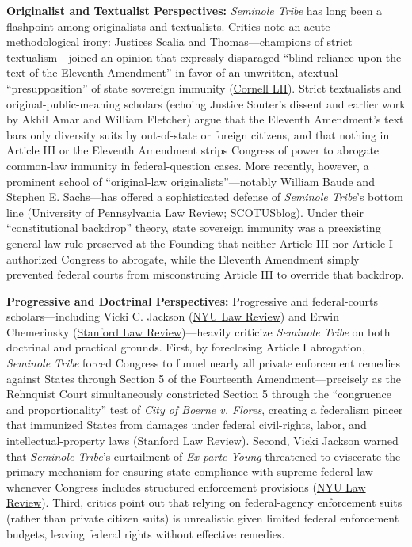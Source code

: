 \documentclass[12pt]{article}
\begin{document}
\textbf{Originalist and Textualist Perspectives:} \textit{Seminole Tribe} has long been a flashpoint among originalists and textualists. Critics note an acute methodological irony: Justices Scalia and Thomas---champions of strict textualism---joined an opinion that expressly disparaged ``blind reliance upon the text of the Eleventh Amendment'' in favor of an unwritten, atextual ``presupposition'' of state sovereign immunity (\href{https://www.law.cornell.edu/supct/html/94-12.ZO.html}{Cornell LII}). Strict textualists and original-public-meaning scholars (echoing Justice Souter's dissent and earlier work by Akhil Amar and William Fletcher) argue that the Eleventh Amendment's text bars only diversity suits by out-of-state or foreign citizens, and that nothing in Article III or the Eleventh Amendment strips Congress of power to abrogate common-law immunity in federal-question cases. More recently, however, a prominent school of ``original-law originalists''---notably William Baude and Stephen E. Sachs---has offered a sophisticated defense of \textit{Seminole Tribe}'s bottom line (\href{https://pennlawreview.com/2021/05/11/the-misunderstood-eleventh-amendment/}{University of Pennsylvania Law Review}; \href{https://www.scotusblog.com/2016/01/academic-highlight-baude-and-sachs-on-state-sovereign-immunity/}{SCOTUSblog}). Under their ``constitutional backdrop'' theory, state sovereign immunity was a preexisting general-law rule preserved at the Founding that neither Article III nor Article I authorized Congress to abrogate, while the Eleventh Amendment simply prevented federal courts from misconstruing Article III to override that backdrop.

\textbf{Progressive and Doctrinal Perspectives:} Progressive and federal-courts scholars---including Vicki C. Jackson (\href{https://www.nyulawreview.org/wp-content/uploads/2018/08/NYULawReview-72-3-Jackson.pdf}{NYU Law Review}) and Erwin Chemerinsky (\href{http://www.stanfordlawreview.org/wp-content/uploads/sites/3/2010/04/chemerinsky.pdf}{Stanford Law Review})---heavily criticize \textit{Seminole Tribe} on both doctrinal and practical grounds. First, by foreclosing Article I abrogation, \textit{Seminole Tribe} forced Congress to funnel nearly all private enforcement remedies against States through Section 5 of the Fourteenth Amendment---precisely as the Rehnquist Court simultaneously constricted Section 5 through the ``congruence and proportionality'' test of \textit{City of Boerne v. Flores}, creating a federalism pincer that immunized States from damages under federal civil-rights, labor, and intellectual-property laws (\href{http://www.stanfordlawreview.org/wp-content/uploads/sites/3/2010/04/chemerinsky.pdf}{Stanford Law Review}). Second, Vicki Jackson warned that \textit{Seminole Tribe}'s curtailment of \textit{Ex parte Young} threatened to eviscerate the primary mechanism for ensuring state compliance with supreme federal law whenever Congress includes structured enforcement provisions (\href{https://www.nyulawreview.org/wp-content/uploads/2018/08/NYULawReview-72-3-Jackson.pdf}{NYU Law Review}). Third, critics point out that relying on federal-agency enforcement suits (rather than private citizen suits) is unrealistic given limited federal enforcement budgets, leaving federal rights without effective remedies.
\end{document}
